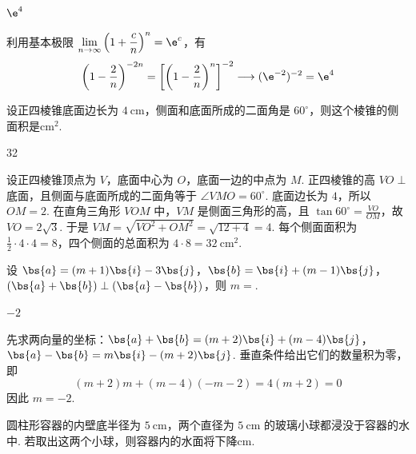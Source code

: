 \documentclass[UTF8,a4paper,oneside,11pt]{ctexbook}
\begin{document}
\begin{answer}
\(\e^{4}\)
\end{answer}

\begin{solution}
利用基本极限 \(\displaystyle\lim_{n\to\infty}\left(1+\frac{c}{n}\right)^n=\e^c\)，有
\[
\left(1-\frac2n\right)^{-2n}=\left[\left(1-\frac2n\right)^n\right]^{-2}\longrightarrow(\e^{-2})^{-2}=\e^4
\]
\end{solution}

\begin{problem}[A]
设正四棱锥底面边长为 \(4 \mathrm{~cm}\)，侧面和底面所成的二面角是 \(60^{\circ}\)，则这个棱锥的侧面积是\fillinblank{}\(\mathrm{cm}^{2}\).
\end{problem}

\begin{answer}
32
\end{answer}

\begin{solution}
设正四棱锥顶点为 \(V\)，底面中心为 \(O\)，底面一边的中点为 \(M\). 正四棱锥的高 \(VO\perp\) 底面，且侧面与底面所成的二面角等于 \(\angle VMO=60^{\circ}\). 底面边长为 \(4\)，所以 \(OM=2\). 在直角三角形 \(VOM\) 中，\(VM\) 是侧面三角形的高，且 \(\tan60^{\circ}=\frac{VO}{OM}\)，故 \(VO=2\sqrt3\). 于是 \(VM=\sqrt{VO^2+OM^2}=\sqrt{12+4}=4\). 每个侧面面积为 \(\frac12\cdot4\cdot4=8\)，四个侧面的总面积为 \(4\cdot8=32\ \mathrm{cm}^2\).
\end{solution}

\reuseproblemnumber
\begin{problem}[B]
设 \(\bs{a}=(m+1)\bs{i}-3\bs{j}\)，\(\bs{b}=\bs{i}+(m-1)\bs{j}\)，\((\bs{a}+\bs{b})\perp(\bs{a}-\bs{b})\)，则 \(m=\)\fillinblank{}.
\end{problem}

\begin{answer}
\(-2\)
\end{answer}

\begin{solution}
先求两向量的坐标：\(\bs{a}+\bs{b}=(m+2)\bs{i}+(m-4)\bs{j}\)，\(\bs{a}-\bs{b}=m\bs{i}-(m+2)\bs{j}\). 垂直条件给出它们的数量积为零，即
\[
(m+2)m+(m-4)(-m-2)=4(m+2)=0
\]
因此 \(m=-2\).
\end{solution}

\begin{problem}[A]
圆柱形容器的内壁底半径为 \(5 \mathrm{~cm}\)，两个直径为 \(5 \mathrm{~cm}\) 的玻璃小球都浸没于容器的水中. 若取出这两个小球，则容器内的水面将下降\fillinblank{}\(\mathrm{cm}\).
\end{problem}
\end{document}
